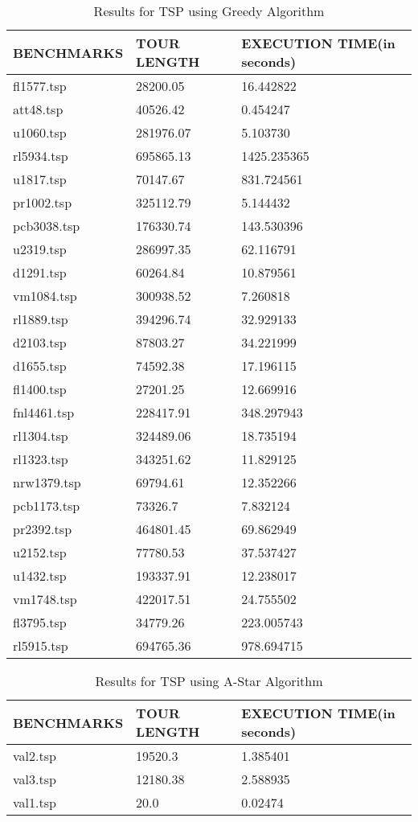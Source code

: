\documentclass[a4paper]{article}
\begin{document}
\begin{table}
\centering
\begin{tabular}{ |p{3cm}|p{3cm}|p{3cm}|}

\hline
BENCHMARKS & TOUR LENGTH & EXECUTION TIME(in seconds)\\
\hline
fl1577.tsp&28200.05&16.442822\\
\hline
att48.tsp&40526.42&0.454247\\
\hline
u1060.tsp&281976.07&5.103730\\
\hline
rl5934.tsp&695865.13&1425.235365\\
\hline
u1817.tsp&70147.67&831.724561\\
\hline
pr1002.tsp&325112.79&5.144432\\
\hline
pcb3038.tsp&176330.74&143.530396\\
\hline
u2319.tsp&286997.35&62.116791\\
\hline
d1291.tsp&60264.84&10.879561\\
\hline
vm1084.tsp&300938.52&7.260818\\
\hline
rl1889.tsp&394296.74&32.929133\\
\hline
d2103.tsp&87803.27&34.221999\\
\hline
d1655.tsp&74592.38&17.196115\\
\hline
fl1400.tsp&27201.25&12.669916\\
\hline
fnl4461.tsp&228417.91&348.297943\\
\hline
rl1304.tsp&324489.06&18.735194\\
\hline
rl1323.tsp&343251.62&11.829125\\
\hline
nrw1379.tsp&69794.61&12.352266\\
\hline
pcb1173.tsp&73326.7&7.832124\\
\hline
pr2392.tsp&464801.45&69.862949\\
\hline
u2152.tsp&77780.53&37.537427\\
\hline
u1432.tsp&193337.91&12.238017\\
\hline
vm1748.tsp&422017.51&24.755502\\
\hline
fl3795.tsp&34779.26&223.005743\\
\hline
rl5915.tsp&694765.36&978.694715\\
\hline
\end{tabular}
\caption{Results for TSP using Greedy Algorithm} \label{tab:GREEDY}
\end{table}

\begin{table}
\centering
\begin{tabular}{ |p{3cm}|p{3cm}|p{3cm}|}
\hline
BENCHMARKS & TOUR LENGTH & EXECUTION TIME(in seconds)\\
\hline
val2.tsp&19520.3&1.385401\\
\hline
val3.tsp&12180.38&2.588935\\
\hline
val1.tsp&20.0&0.02474\\
\hline
\end{tabular}
\caption{Results for TSP using A-Star Algorithm} \label{tab:ASTAR}
\end{table}
\end{document}
